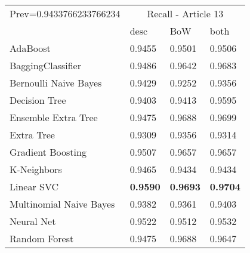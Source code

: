 \begin{tabular}{|l|l|l|l| }
\hline
Prev=0.9433766233766234 &  \multicolumn{3}{c|}{Recall - Article 13} \\
\cline{2-4} & desc & BoW & both \\ \hline
AdaBoost                & 0.9455 & 0.9501 & 0.9506\\
BaggingClassifier       & 0.9486 & 0.9642 & 0.9683\\
Bernoulli Naive Bayes   & 0.9429 & 0.9252 & 0.9356\\
Decision Tree           & 0.9403 & 0.9413 & 0.9595\\
Ensemble Extra Tree     & 0.9475 & 0.9688 & 0.9699\\
Extra Tree              & 0.9309 & 0.9356 & 0.9314\\
Gradient Boosting       & 0.9507 & 0.9657 & 0.9657\\
K-Neighbors             & 0.9465 & 0.9434 & 0.9434\\
Linear SVC              & {\bf 0.9590} & {\bf 0.9693} & {\bf 0.9704}\\
Multinomial Naive Bayes & 0.9382 & 0.9361 & 0.9403\\
Neural Net              & 0.9522 & 0.9512 & 0.9532\\
Random Forest           & 0.9475 & 0.9688 & 0.9647\\
\hline
\end{tabular}